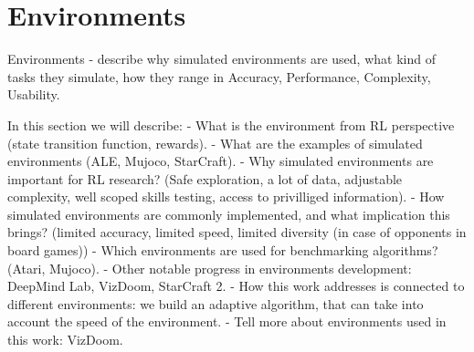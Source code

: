 \section{Environments}

Environments - describe why simulated environments are used, what kind of
tasks they simulate, how they range in Accuracy, Performance, Complexity,
Usability.

In this section we will describe:
- What is the environment from RL perspective (state transition function, rewards).
- What are the examples of simulated environments (ALE, Mujoco, StarCraft).
- Why simulated environments are important for RL research? (Safe exploration, a lot of data,
adjustable complexity, well scoped skills testing, access to privilliged information).
- How simulated environments are commonly implemented, and what implication this brings?
(limited accuracy, limited speed, limited diversity (in case of opponents in board games))
- Which environments are used for benchmarking algorithms? (Atari, Mujoco).
- Other notable progress in environments development: DeepMind Lab, VizDoom, StarCraft 2.
- How this work addresses is connected to different environments: we build an adaptive algorithm,
that can take into account the speed of the environment.
- Tell more about environments used in this work: VizDoom.

%
%
